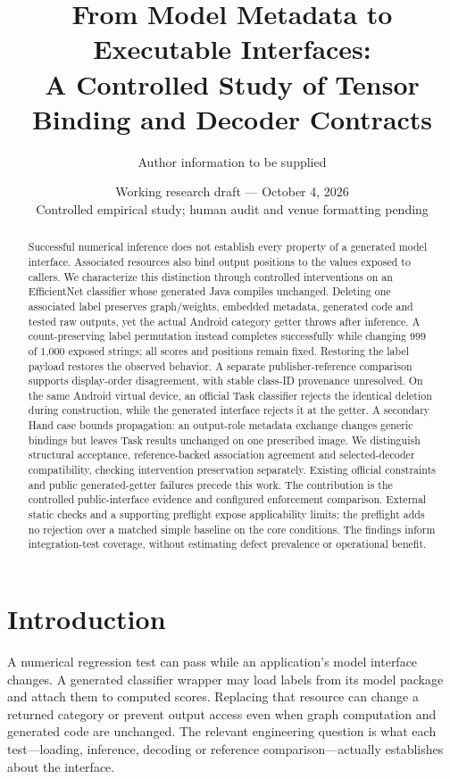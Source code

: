 \documentclass[10pt,twocolumn,letterpaper]{article}
\title{From Model Metadata to Executable Interfaces:\\A Controlled Study of Tensor Binding and Decoder Contracts}
\author{Author information to be supplied}
\date{Working research draft --- October 4, 2026\\\small Controlled empirical study; human audit and venue formatting pending}
\begin{document}
\maketitle

\begin{abstract}
Successful numerical inference does not establish every property of a generated model interface. Associated resources also bind output positions to the values exposed to callers. We characterize this distinction through controlled interventions on an EfficientNet classifier whose generated Java compiles unchanged. Deleting one associated label preserves graph/weights, embedded metadata, generated code and tested raw outputs, yet the actual Android category getter throws after inference. A count-preserving label permutation instead completes successfully while changing 999 of 1,000 exposed strings; all scores and positions remain fixed. Restoring the label payload restores the observed behavior. A separate publisher-reference comparison supports display-order disagreement, with stable class-ID provenance unresolved. On the same Android virtual device, an official Task classifier rejects the identical deletion during construction, while the generated interface rejects it at the getter. A secondary Hand case bounds propagation: an output-role metadata exchange changes generic bindings but leaves Task results unchanged on one prescribed image. We distinguish structural acceptance, reference-backed association agreement and selected-decoder compatibility, checking intervention preservation separately. Existing official constraints and public generated-getter failures precede this work. The contribution is the controlled public-interface evidence and configured enforcement comparison. External static checks and a supporting preflight expose applicability limits; the preflight adds no rejection over a matched simple baseline on the core conditions. The findings inform integration-test coverage, without estimating defect prevalence or operational benefit.
\end{abstract}

\section{Introduction}
A numerical regression test can pass while an application's model interface changes. A generated classifier wrapper may load labels from its model package and attach them to computed scores. Replacing that resource can change a returned category or prevent output access even when graph computation and generated code are unchanged. The relevant engineering question is what each test---loading, inference, decoding or reference comparison---actually establishes about the interface.
\end{document}

